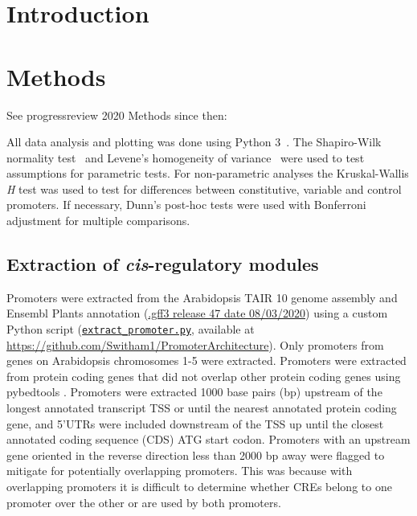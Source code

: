 
\section{Introduction}\label{chapter1:introduction}
\section{Methods}\label{chapter1:methods}
See progressreview 2020
Methods since then:


All data analysis and plotting was done using Python 3~\autocite{pythoncoreteamPythonDynamicOpen2020}.
The Shapiro\hyp{}Wilk normality test~\autocite{shapiroAnalysisVarianceTest1965} and Levene's homogeneity of variance~\autocite{leveneRobustTestsEquality1960} were used to test assumptions for parametric tests.
For non-parametric analyses the Kruskal-Wallis \textit{H} test \autocite{kruskalUseRanksOneCriterion1952} was used to test for differences between constitutive, variable and control promoters.
If necessary, Dunn's post-hoc tests \autocite{dunnMultipleComparisonsUsing1964} were used with Bonferroni adjustment for multiple comparisons.

\subsection{Extraction of \textit{cis}-regulatory modules}\label{chapter1:methods:extraction-of-cis-regulatory-modules}

Promoters were extracted from the Arabidopsis TAIR 10 \autocite{lameschArabidopsisInformationResource2012} genome assembly and Ensembl Plants \autocite{howeEnsemblGenomes20202020} annotation (\href{ftp://ftp.ensemblgenomes.org/pub/release-47/plants/gff3/arabidopsis_thaliana/}{.gff3 release 47 date 08/03/2020}) using a custom Python script (\href{https://github.com/Switham1/PromoterArchitecture/blob/master/src/data_sorting/extract_promoter.py}{\texttt{extract\_promoter.py}}, available at \url{https://github.com/Switham1/PromoterArchitecture}).
Only promoters from genes on Arabidopsis chromosomes 1-5 were extracted.
Promoters were extracted from protein coding genes that did not overlap other protein coding genes using pybedtools \autocite{dalePybedtoolsFlexiblePython2011}.
Promoters were extracted 1000 base pairs (bp) upstream of the longest annotated transcript TSS or until the nearest annotated protein coding gene, and 5'UTRs were included downstream of the TSS up until the closest annotated coding sequence (CDS) ATG start codon.
Promoters with an upstream gene oriented in the reverse direction less than 2000 bp away were flagged to mitigate for potentially overlapping promoters.
This was because with overlapping promoters it is difficult to determine whether CREs belong to one promoter over the other or are used by both promoters.

